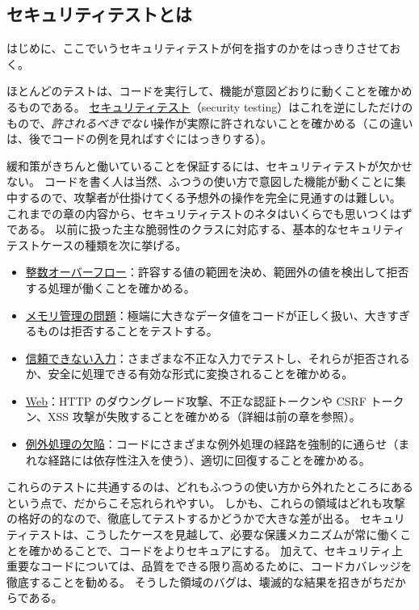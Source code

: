 \documentclass[uplatex]{jsarticle}
\def\label#1{}%
\begin{document}
\subsection{セキュリティテストとは}

はじめに、ここでいうセキュリティテストが何を指すのかをはっきりさせておく。

\begin{dfn}[セキュリティテスト]\label{dfn:ch12-security-testing}
ほとんどのテストは、コードを実行して、機能が意図どおりに動くことを確かめるものである。
\underline{セキュリティテスト}（security testing）はこれを逆にしただけのもので、\emph{許されるべきでない}操作が実際に許されないことを確かめる（この違いは、後でコードの例を見ればすぐにはっきりする）。
\end{dfn}

緩和策がきちんと働いていることを保証するには、セキュリティテストが欠かせない。
コードを書く人は当然、ふつうの使い方で意図した機能が動くことに集中するので、攻撃者が仕掛けてくる予想外の操作を完全に見通すのは難しい。
これまでの章の内容から、セキュリティテストのネタはいくらでも思いつくはずである。
以前に扱った主な脆弱性のクラスに対応する、基本的なセキュリティテストケースの種類を次に挙げる。

\begin{itemize}
\item \underline{整数オーバーフロー}：許容する値の範囲を決め、範囲外の値を検出して拒否する処理が働くことを確かめる。
\item \underline{メモリ管理の問題}：極端に大きなデータ値をコードが正しく扱い、大きすぎるものは拒否することをテストする。
\item \underline{信頼できない入力}：さまざまな不正な入力でテストし、それらが拒否されるか、安全に処理できる有効な形式に変換されることを確かめる。
\item \underline{Web}：HTTP のダウングレード攻撃、不正な認証トークンや CSRF トークン、XSS 攻撃が失敗することを確かめる（詳細は前の章を参照）。
\item \underline{例外処理の欠陥}：コードにさまざまな例外処理の経路を強制的に通らせ（まれな経路には依存性注入を使う）、適切に回復することを確かめる。
\end{itemize}

これらのテストに共通するのは、どれもふつうの使い方から外れたところにあるという点で、だからこそ忘れられやすい。
しかも、これらの領域はどれも攻撃の格好の的なので、徹底してテストするかどうかで大きな差が出る。
セキュリティテストは、こうしたケースを見越して、必要な保護メカニズムが常に働くことを確かめることで、コードをよりセキュアにする。
加えて、セキュリティ上重要なコードについては、品質をできる限り高めるために、コードカバレッジを徹底することを勧める。
そうした領域のバグは、壊滅的な結果を招きがちだからである。
\end{document}
